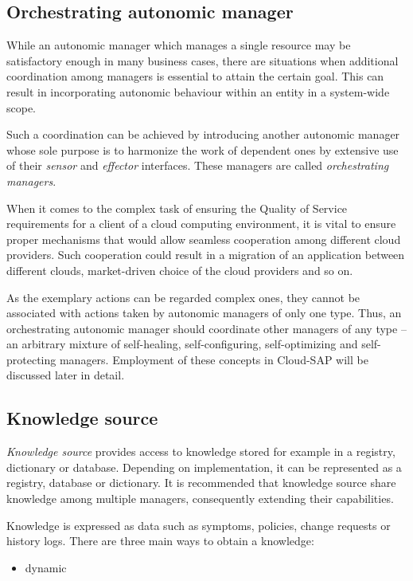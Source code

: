 \subsection{Orchestrating autonomic manager}
While an autonomic manager which manages a single resource may be satisfactory enough in many business cases, there are situations when additional coordination among managers is essential to attain the certain goal. This can result in incorporating autonomic behaviour within an entity in a system-wide scope.

Such a coordination can be achieved by introducing another autonomic manager whose sole purpose is to harmonize the work of dependent ones by extensive use of their \emph{sensor} and \emph{effector} interfaces. These managers are called \emph{orchestrating managers}.

When it comes to the complex task of ensuring the Quality of Service requirements for a client of a cloud computing environment, it is vital to ensure proper mechanisms that would allow seamless cooperation among different cloud providers. Such cooperation could result in a migration of an application between different clouds, market-driven choice of the cloud providers and so on.

As the exemplary actions can be regarded complex ones, they cannot be associated with actions taken by autonomic managers of only one type. Thus, an orchestrating autonomic manager should coordinate other managers of any type -- an arbitrary mixture of self-healing, self-configuring, self-optimizing and self-protecting managers. Employment of these concepts in Cloud-SAP will be discussed later in detail.

\subsection{Knowledge source}
\emph{Knowledge source} provides access to knowledge stored for example in a registry, dictionary or database. Depending on implementation, it can be represented as a registry, database or dictionary. It is recommended that knowledge source share knowledge among multiple managers, consequently extending their capabilities.

Knowledge is expressed as data such as symptoms, policies, change requests or history logs. There are three main ways to obtain a knowledge:
\begin{itemize}
 \item dynamic
 
\end{itemize}


